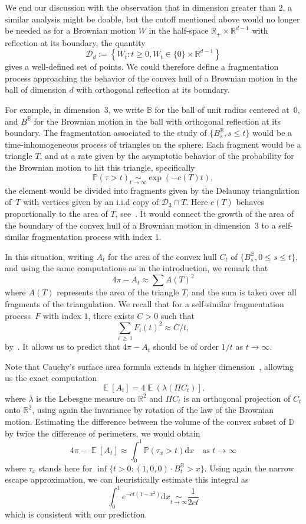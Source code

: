 \documentclass[AHL,Unicode,longabstracts,published]{cedram}
\newcommand{\R}{\mathbb{R}}
\newcommand{\bbB}{\mathbb{B}}
\newcommand{\D}{\mathbb{D}}
\renewcommand{\P}{\mathbb{P}}
\DeclareMathOperator{\E}{\mathbb{E}}
\newcommand{\dd}{\mathrm{d}}
\newcommand{\calD}{\mathcal{D}}
\begin{document}
We end our discussion with the observation that in dimension greater than $2$, a similar analysis might be doable, but the cutoff mentioned above would no longer be needed as for a Brownian motion $W$ in the half-space $\R_+ \times \R^{d-1}$ with reflection at its boundary, the quantity
\[
\calD_d := \left\{W_t : t \geq 0, W_t \in \{0\} \times \R^{d-1} \right\}
\]
gives a well-defined set of points. We could therefore define a fragmentation process approaching the behavior of the convex hull of a Brownian motion in the ball of dimension $d$ with orthogonal reflection at its boundary.

For example, in dimension~$3$, we write $\bbB$ for the ball of unit radius centered at~$0$, and $B^\bbB$ for the Brownian motion in the ball with orthogonal reflection at its boundary. The fragmentation associated to the study of $\{B^\bbB_s, s \leq t\}$ would be a time-inhomogeneous process of triangles on the sphere. Each fragment would be a triangle $T$, and at a rate given by the asymptotic behavior of the probability for the Brownian motion to hit this triangle, specifically
\[
\P(\tau > t) \underset{t \to \infty}{\sim} \exp\left(- c(T) t \right),
\]
the element would be divided into fragments given by the Delaunay triangulation of~$T$ with vertices given by an i.i.d copy of $\calD_3 \cap T$. Here $c(T)$ behaves proportionally to the area of $T$, see~\cite{net3}. It would connect the growth of the area of the boundary of the convex hull of a Brownian motion in dimension~$3$ to a self-similar fragmentation process with index $1$.

In this situation, writing $A_t$ for the area of the convex hull $C_t$ of $\{B^\bbB_s, 0 \leq s \leq t\}$, and using the same computations as in the introduction, we remark that
\[
4 \pi - A_t \approx \sum A(T)^2
\]
where $A(T)$ represents the area of the triangle $T$, and the sum is taken over all fragments of the triangulation. We recall that for a self-similar fragmentation process~$F$ with index $1$, there exists $C> 0$ such that
\[
\sum_{i\,\geq\,1} F_i(t)^2 \approx C/t,
\]
by~\cite[Theorem~3]{BertoinAB03}. It allows us to predict that $4\pi - A_t$ should be of order $1/t$ as $t \to \infty$.

Note that Cauchy's surface area formula extends in higher dimension~\cite{TsV}, allowing us the exact computation
\[
\E[A_t] = 4 \E\left(\lambda(\Pi C_t) \right],
\]
where $\lambda$ is the Lebesgue measure on $\R^2$ and $\Pi C_t$ is an orthogonal projection of $C_t$ onto $\R^2$, using again the invariance by rotation of the law of the Brownian motion. Estimating the difference between the volume of the convex subset of $\D$ by twice the difference of perimeters, we would obtain
\[
4 \pi - \E[A_t] \approx \int_0^1 \P(\tau_x > t) \dd x \quad \text{as }t \to \infty
\]
where $\tau_x$ stands here for $\inf\{t> 0 : (1,0,0) \cdot B^\bbB_t > x\}$. Using again the narrow escape approximation, we can heuristically estimate this integral as
\[
\int_0^1 e^{-c t (1 - x^2)} \dd x \underset{t \to \infty}\sim \frac{1}{2ct}
\]
which is consistent with our prediction.




\end{document}
